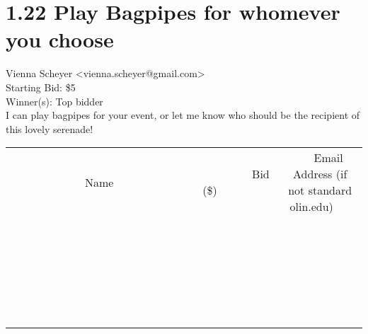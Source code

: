 \documentclass[11pt]{article}
\begin{document}
					\section*{1.22 Play Bagpipes for whomever you choose}
					Vienna Scheyer <vienna.scheyer@gmail.com> \\
					Starting Bid: \$5 \\
					Winner(s): Top bidder \\
					I can play bagpipes for your event, or let me know who should be the recipient of this lovely serenade! \\
					[6ex]
					\begin{tabular}{c c c}
						~~~~~~~~~~~~~Name~~~~~~~~~~~~~ & ~~~~~~~~~Bid (\$)~~~~~~~~~ & ~~~Email Address (if not standard olin.edu)~~~ \\
				
 & & \\
\hline
 & & \\
\hline
 & & \\
\hline
 & & \\
\hline
 & & \\
\hline
 & & \\
\hline
 & & \\
\hline
 & & \\
\hline
 & & \\
\hline
 & & \\
\hline
 & & \\
\hline
 & & \\
\hline
 & & \\
\hline
 & & \\
\hline
 & & \\
\hline
 & & \\
\hline
 & & \\
\hline
 & & \\
\hline
 & & \\
\hline
 & & \\
\hline
 & & \\
\hline
 & & \\
\hline
 & & \\
\hline
 & & \\
\hline
 & & \\
\hline
 & & \\
\hline
					\end{tabular}
					\clearpage
				
\end{document}
